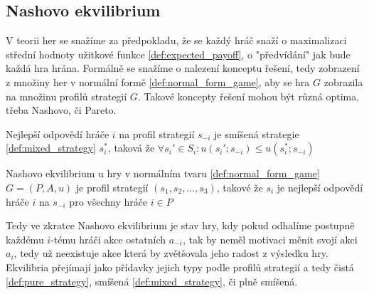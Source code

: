 \subsection{Nashovo ekvilibrium}
V teorii her se snažíme za předpokladu, že se každý hráč snaží o maximalizaci střední hodnoty užitkové funkce \ref{def:expected_payoff}, o "předvídání"  jak bude každá hra hrána. 
Formálně se snažíme o nalezení konceptu řešení, tedy zobrazení z množiny her v normální formě \ref{def:normal_form_game}, aby se hra $G$ zobrazila na množinu profilů strategií $G$. Takové koncepty řešení mohou být různá optima, třeba Nashovo, či Pareto. 
\begin{definition}
\label{def:best_response}
Nejlepší odpovědí hráče $i$ na profil strategií $s_{-i}$ je smíšená strategie \ref{def:mixed_strategy} $s^*_i$, taková že $\forall s_i' \in S_i: u(s_i'; s_{-i}) \leq u(s^*_i;s_{-i})$
\end{definition}
\begin{definition}
\label{def:nash_equilibrium}
Nashovo ekvilibrium u hry v normálním tvaru \ref{def:normal_form_game} $G = (P, A, u)$ je profil strategií $(s_1, s_2, \dots, s_3)$, takové že $s_i$ je nejlepší odpovědí hráče $i$ na $s_{-i}$ pro všechny hráče $i \in P$
\end{definition}
Tedy ve zkratce Nashovo ekvilibrium je stav hry, kdy pokud odhalíme postupně každému $i$-tému hráči akce ostatních $a_{-i}$, tak by neměl motivaci měnit svojí akci $a_i$, tedy už neexistuje akce která by zvětšovala jeho radost z výsledku hry. 
Ekvilibria přejímají jako přídavky jejich typy podle profilů strategií a tedy čistá \ref{def:pure_strategy}, smíšená \ref{def:mixed_strategy}, či plně smíšená. 


